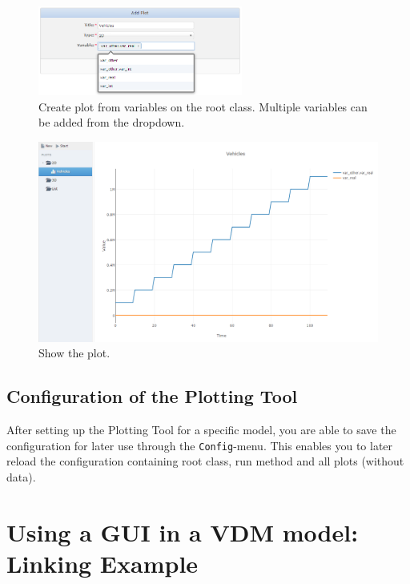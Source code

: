 \documentclass{overturerepchap}
\begin{document}
\begin{figure}[!h]
\begin{center}
  \includegraphics[width=0.6\textwidth]{screenDumps/tempo_add_plot}
  \caption{Create plot from variables on the root class. Multiple variables can be added from the dropdown.}
  \label{fig:gui:tempoAddPlot}
\end{center}
\end{figure}

\begin{figure}[!h]
\begin{center}
  \includegraphics[width=\textwidth]{screenDumps/tempo_show_plot}
  \caption{Show the plot.}
  \label{fig:gui:tempoShowPlot}
\end{center}
\end{figure}

\subsection{Configuration of the Plotting Tool}
After setting up the Plotting Tool for a specific model, you are able to save the configuration for later use through the \texttt{Config}-menu. This enables you to later reload the configuration containing root class, run method and all plots (without data).

\section{Using a GUI in a VDM model: Linking Example}\label{sec:gui}
\end{document}

